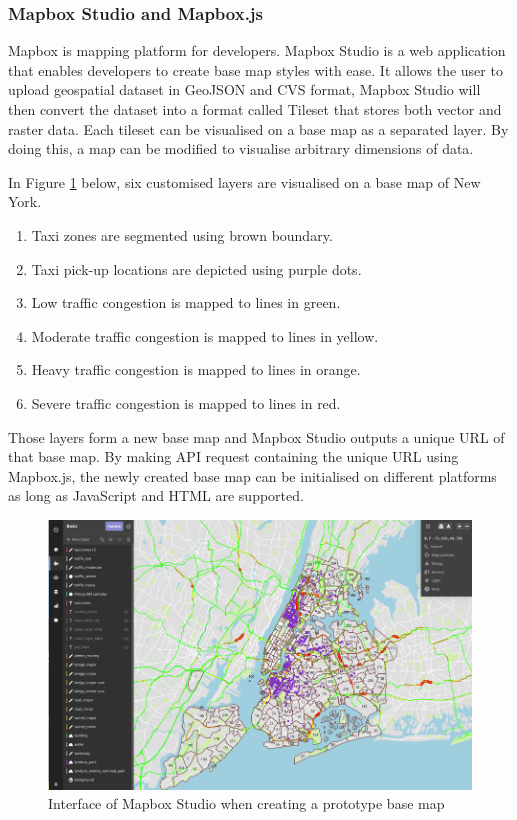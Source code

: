 \documentclass[11pt,a4paper]{article}
\begin{document}
\subsubsection{Mapbox Studio and Mapbox.js}
Mapbox is mapping platform for developers. Mapbox Studio is a web application that enables developers to create base map styles with ease. It allows the user to upload geospatial dataset in GeoJSON and CVS format, Mapbox Studio will then convert the dataset into a format called Tileset that stores both vector and raster data. Each tileset can be visualised on a base map as a separated layer. By doing this, a map can be modified to visualise arbitrary dimensions of data. 

In Figure \ref{fig:7} below, six customised layers are visualised on a base map of New York.
\begin{enumerate}
	\item Taxi zones are segmented using brown boundary.
	\item Taxi pick-up locations are depicted using purple dots.
	\item Low traffic congestion is mapped to lines in green.
	\item Moderate traffic congestion is mapped to lines in yellow.
	\item Heavy traffic congestion is mapped to lines in orange.
	\item Severe traffic congestion is mapped to lines in red.
\end{enumerate}

Those layers form a new base map and Mapbox Studio outputs a unique URL of that base map. By making API request containing the unique URL using Mapbox.js, the newly created base map can be initialised on different platforms as long as JavaScript and HTML are supported.

\begin{figure}[H]
	\centering
	\includegraphics[width=\textwidth,keepaspectratio]{figures/fig7.png}
	\caption{\label{fig:7}Interface of Mapbox Studio when creating a prototype base map \parencite{Mapbox2017}}
\end{figure}
\end{document}

